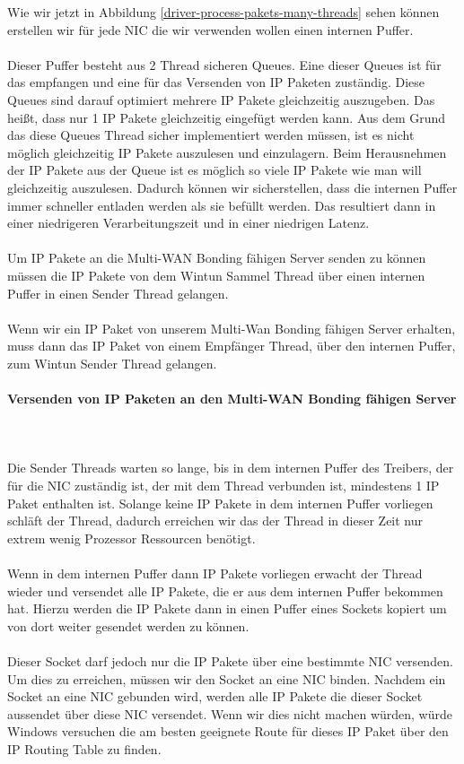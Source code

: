 Wie wir jetzt in Abbildung \ref{driver-process-pakets-many-threads} sehen können erstellen wir für jede NIC die wir verwenden wollen einen internen Puffer.
\\\\
Dieser Puffer besteht aus 2 Thread sicheren Queues. Eine dieser Queues ist für das empfangen und eine für das Versenden von IP Paketen zuständig. Diese Queues sind darauf optimiert mehrere IP Pakete gleichzeitig auszugeben. Das heißt, dass nur 1 IP Pakete gleichzeitig eingefügt werden kann. Aus dem Grund das diese Queues Thread sicher implementiert werden müssen, ist es nicht möglich gleichzeitig IP Pakete auszulesen und einzulagern. Beim Herausnehmen der IP Pakete aus der Queue ist es möglich so viele IP Pakete wie man will gleichzeitig auszulesen. Dadurch können wir sicherstellen, dass die internen Puffer immer schneller entladen werden als sie befüllt werden. Das resultiert dann in einer niedrigeren Verarbeitungszeit und in einer niedrigen Latenz.
\\\\
Um IP Pakete an die Multi-WAN Bonding fähigen Server senden zu können müssen die IP Pakete von dem Wintun Sammel Thread über einen internen Puffer in einen Sender Thread gelangen. 
\\\\
Wenn wir ein IP Paket von unserem Multi-Wan Bonding fähigen Server erhalten, muss dann das IP Paket von einem Empfänger Thread, über den internen Puffer, zum Wintun Sender Thread gelangen.

\paragraph{Versenden von IP Paketen an den Multi-WAN Bonding fähigen Server}
\ \\\\

Die Sender Threads warten so lange, bis in dem internen Puffer des Treibers, der für die NIC zuständig ist, der mit dem Thread verbunden ist, mindestens 1 IP Paket enthalten ist. Solange keine IP Pakete in dem internen Puffer vorliegen schläft der Thread, dadurch erreichen wir das der Thread in dieser Zeit nur extrem wenig Prozessor Ressourcen benötigt.
\\\\
Wenn in dem internen Puffer dann IP Pakete vorliegen erwacht der Thread wieder und versendet alle IP Pakete, die er aus dem internen Puffer bekommen hat. Hierzu werden die IP Pakete dann in einen Puffer eines Sockets kopiert um von dort weiter gesendet werden zu können. 
\\\\
Dieser Socket darf jedoch nur die IP Pakete über eine bestimmte NIC versenden. Um dies zu erreichen, müssen wir den Socket an eine NIC binden. Nachdem ein Socket an eine NIC gebunden wird, werden alle IP Pakete die dieser Socket aussendet über diese NIC versendet. Wenn wir dies nicht machen würden, würde Windows versuchen die am besten geeignete Route für dieses IP Paket über den IP Routing Table zu finden.

